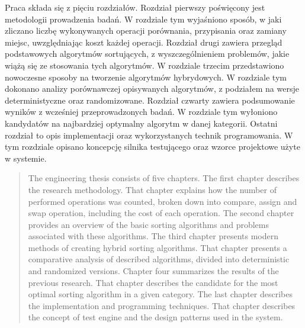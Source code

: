 \begin{streszczenie}
Praca składa się z pięciu rozdziałów.
Rozdział pierwszy poświęcony jest metodologii prowadzenia badań. W rozdziale tym wyjaśniono sposób, w jaki zliczano liczbę wykonywanych operacji porównania, przypisania oraz zamiany miejsc, uwzględniając koszt każdej operacji.
Rozdział drugi zawiera przegląd podstawowych algorytmów sortujących, z wyszczególnieniem problemów, jakie wiążą się ze stosowania tych algorytmów.
W rozdziale trzecim przedstawiono nowoczesne sposoby na tworzenie algorytmów hybrydowych. W rozdziale tym dokonano analizy porównawczej opisywanych algorytmów, z podziałem na wersje deterministyczne oraz randomizowane.
Rozdział czwarty zawiera podsumowanie wyników z wcześniej przeprowadzonych badań. W rozdziale tym wyłoniono kandydatów na najbardziej optymalny algorytm w danej kategorii.
Ostatni rozdział to opis implementacji oraz wykorzystanych technik programowania. W tym rozdziale opisano koncepcję silnika testującego oraz wzorce projektowe użyte w systemie.\\
\end{streszczenie}

\vspace*{1cm}
\begin{abstract}
The engineering thesis consists of five chapters.
The first chapter describes the research methodology. That chapter explains how the number of performed operations was counted, broken down into compare, assign and swap operation, including the cost of each operation.
The second chapter provides an overview of the basic sorting algorithms and problems associated with these algorithms.
The third chapter presents modern methods of creating hybrid sorting algorithms. That chapter presents a comparative analysis of described algorithms, divided into deterministic and randomized versions.
Chapter four summarizes the results of the previous research. That chapter describes the candidate for the most optimal sorting algorithm in a given category.
The last chapter describes the implementation and programming techniques. That chapter describes the concept of test engine and the design patterns used in the system.\\
\end{abstract}
